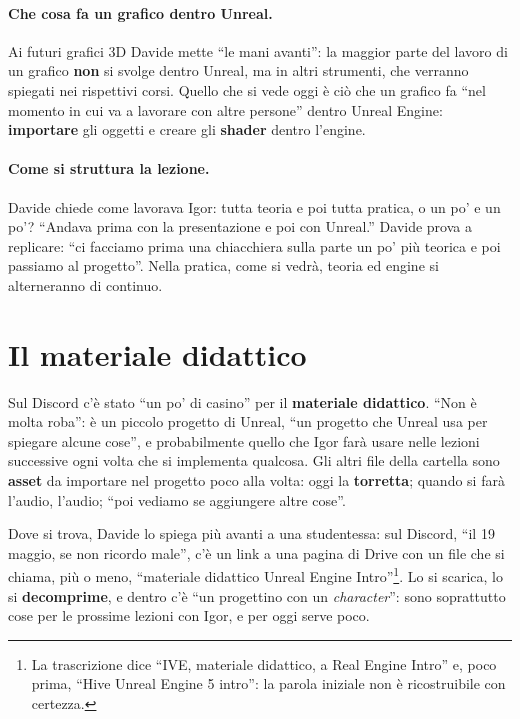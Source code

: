 \paragraph{Che cosa fa un grafico dentro Unreal.} Ai futuri grafici 3D Davide mette
``le mani avanti'': la maggior parte del lavoro di un grafico \textbf{non} si svolge
dentro Unreal, ma in altri strumenti, che verranno spiegati nei rispettivi corsi.
Quello che si vede oggi è ciò che un grafico fa ``nel momento in cui va a lavorare con
altre persone'' dentro Unreal Engine: \textbf{importare} gli oggetti e creare gli
\textbf{shader} dentro l'engine.

\paragraph{Come si struttura la lezione.} Davide chiede come lavorava Igor: tutta
teoria e poi tutta pratica, o un po' e un po'? ``Andava prima con la presentazione e poi
con Unreal.'' Davide prova a replicare: ``ci facciamo prima una chiacchiera sulla parte
un po' più teorica e poi passiamo al progetto''. Nella pratica, come si vedrà, teoria
ed engine si alterneranno di continuo.

\section{Il materiale didattico}
\label{ue3:sec:didattico}

Sul Discord c'è stato ``un po' di casino'' per il \textbf{materiale didattico}. ``Non è
molta roba'': è un piccolo progetto di Unreal, ``un progetto che Unreal usa per
spiegare alcune cose'', e probabilmente quello che Igor farà usare nelle lezioni
successive ogni volta che si implementa qualcosa. Gli altri file della cartella sono
\textbf{asset} da importare nel progetto poco alla volta: oggi la \textbf{torretta};
quando si farà l'audio, l'audio; ``poi vediamo se aggiungere altre cose''.

Dove si trova, Davide lo spiega più avanti a una studentessa: sul Discord, ``il 19
maggio, se non ricordo male'', c'è un link a una pagina di Drive con un file che si
chiama, più o meno, ``materiale didattico Unreal Engine Intro''\footnote{La trascrizione
dice ``IVE, materiale didattico, a Real Engine Intro'' e, poco prima, ``Hive Unreal
Engine 5 intro'': la parola iniziale non è ricostruibile con certezza.}. Lo si
scarica, lo si \textbf{decomprime}, e dentro c'è ``un progettino con un
\emph{character}'': sono soprattutto cose per le prossime lezioni con Igor, e per oggi
serve poco.

